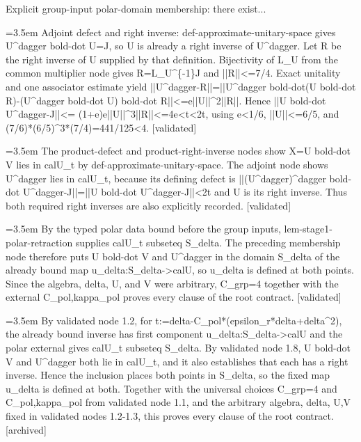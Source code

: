 \documentclass{article}
\newcommand{\step}[1]{\par\noindent\hangindent=3.5em\hangafter=1%
  \makebox[3.5em][l]{\textbf{#1.}}}
\newcommand{\steptag}[1]{\hfill{\small\textsf{[#1]}}}
\begin{document}
\begin{proofbox}{Explicit group-input polar-domain membership: there exist...}
\step{1.7} Adjoint defect and right inverse: def-approximate-unitary-space gives U\textasciicircum{}dagger bold-dot U=J, so U is already a right inverse of U\textasciicircum{}dagger. Let R be the right inverse of U supplied by that definition. Bijectivity of L\_U from the common multiplier node gives R=L\_U\textasciicircum{}\{-1\}J and ||R||<=7/4. Exact unitality and one associator estimate yield ||U\textasciicircum{}dagger-R||=||U\textasciicircum{}dagger bold-dot(U bold-dot R)-(U\textasciicircum{}dagger bold-dot U) bold-dot R||<=e||U||\textasciicircum{}2||R||. Hence ||U bold-dot U\textasciicircum{}dagger-J||<= (1+e)e||U||\textasciicircum{}3||R||<=4e<t<2t, using e<1/6, ||U||<=6/5, and (7/6)*(6/5)\textasciicircum{}3*(7/4)=441/125<4. \steptag{validated} \\[4pt]
\step{1.8} The product-defect and product-right-inverse nodes show X=U bold-dot V lies in calU\_t by def-approximate-unitary-space. The adjoint node shows U\textasciicircum{}dagger lies in calU\_t, because its defining defect is ||(U\textasciicircum{}dagger)\textasciicircum{}dagger bold-dot U\textasciicircum{}dagger-J||=||U bold-dot U\textasciicircum{}dagger-J||<2t and U is its right inverse. Thus both required right inverses are also explicitly recorded. \steptag{validated} \\[4pt]
\step{1.9} By the typed polar data bound before the group inputs, lem-stage1-polar-retraction supplies calU\_t subseteq S\_delta. The preceding membership node therefore puts U bold-dot V and U\textasciicircum{}dagger in the domain S\_delta of the already bound map u\_delta:S\_delta->calU, so u\_delta is defined at both points. Since the algebra, delta, U, and V were arbitrary, C\_grp=4 together with the external C\_pol,kappa\_pol proves every clause of the root contract. \steptag{validated} \\[6pt]
\step{1.9.1} By validated node 1.2, for t:=delta-C\_pol*(epsilon\_r*delta+delta\textasciicircum{}2), the already bound inverse has first component u\_delta:S\_delta->calU and the polar external gives calU\_t subseteq S\_delta. By validated node 1.8, U bold-dot V and U\textasciicircum{}dagger both lie in calU\_t, and it also establishes that each has a right inverse. Hence the inclusion places both points in S\_delta, so the fixed map u\_delta is defined at both. Together with the universal choices C\_grp=4 and C\_pol,kappa\_pol from validated node 1.1, and the arbitrary algebra, delta, U,V fixed in validated nodes 1.2-1.3, this proves every clause of the root contract. \steptag{archived} \\[4pt]

\end{proofbox}
\end{document}
